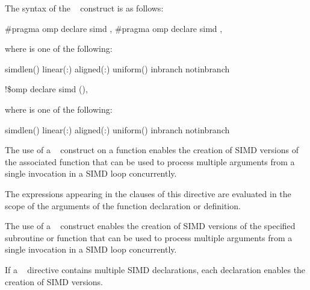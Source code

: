 \syntax
The syntax of the ~ construct is as follows:

\ccppspecificstart
\begin{boxedcode}
\#pragma omp declare simd \plc{[clause[ [},\plc{] clause] ... ] new-line}
\plc{[}\#pragma omp declare simd \plc{[clause[ [},\plc{] clause] ... ] new-line]}
\plc{[ ... ]}
\end{boxedcode}

where  is one of the following:

\begin{indentedcodelist}
simdlen()
linear(\plc{linear-list[ }:\plc{ linear-step]})
aligned(\plc{argument-list[ }:\plc{ alignment]})
uniform()
inbranch
notinbranch
\end{indentedcodelist}
\ccppspecificend


\fortranspecificstart
\begin{boxedcode}
!\$omp declare simd \plc{[}()\plc{] [clause[ [},\plc{] clause] ... ]}
\end{boxedcode}

where  is one of the following:
\begin{indentedcodelist}
simdlen()
linear(\plc{linear-list[ }:\plc{ linear-step]})
aligned(\plc{argument-list[ }:\plc{ alignment]})
uniform()
inbranch
notinbranch
\end{indentedcodelist}
\fortranspecificend


\descr
\ccppspecificstart
The use of a ~ construct on a function enables the creation of SIMD 
versions of the associated function that can be used to process multiple arguments from 
a single invocation in a SIMD loop concurrently.

The expressions appearing in the clauses of this directive are evaluated in the scope of 
the arguments of the function declaration or definition.
\ccppspecificend

\begin{samepage}
\fortranspecificstart
The use of a ~ construct enables the creation of SIMD versions of the 
specified subroutine or function that can be used to process multiple arguments from a 
single invocation in a SIMD loop concurrently. 
\fortranspecificend
\end{samepage}

If a ~ directive contains multiple SIMD declarations,
each declaration enables the creation of SIMD versions.

